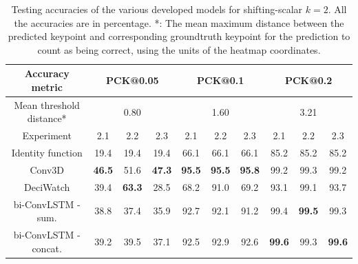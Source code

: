 \documentclass[./main.tex]{subfiles}
\begin{document}
\begin{table}[htbp]
    \begin{tabular}{c||ccc|ccc|ccc}
        \hline
        Accuracy metric & \multicolumn{3}{c}{PCK@0.05} & \multicolumn{3}{c}{PCK@0.1} & \multicolumn{3}{c}{PCK@0.2} \\
        \hline
        Mean threshold distance* & \multicolumn{3}{c}{0.80} & \multicolumn{3}{c}{1.60} & \multicolumn{3}{c}{3.21} \\
        \hline
        Experiment & 2.1 & 2.2 & 2.3 & 2.1 & 2.2 & 2.3 & 2.1 & 2.2 & 2.3 \\
        \hline
        \hline
        Identity function & 19.4 & 19.4 & 19.4 & 66.1 & 66.1 & 66.1 & 85.2 & 85.2 & 85.2 \\
        Conv3D & \textbf{46.5} & 51.6 & \textbf{47.3} & \textbf{95.5} & \textbf{95.5} & \textbf{95.8} & 99.2 & 99.3 & 99.2 \\
        DeciWatch & 39.4 & \textbf{63.3} & 28.5 & 68.2 & 91.0 & 69.2 & 93.1 & 99.1 & 93.7 \\
        bi-ConvLSTM - sum. & 38.8 & 37.4 & 35.9 & 92.7 & 92.1 & 91.2 & 99.4 & \textbf{99.5} & 99.3 \\
        bi-ConvLSTM - concat. & 39.2 & 39.5 & 37.1 & 92.5 & 92.9 & 92.6 & \textbf{99.6} & 99.3 & \textbf{99.6} \\
        \hline
    \end{tabular}
    \caption{Testing accuracies of the various developed models for shifting-scalar $k = 2$. All the accuracies are in percentage. *: The mean maximum distance between the predicted keypoint and corresponding groundtruth keypoint for the prediction to count as being correct, using the units of the heatmap coordinates.}
    \label{tab:finetune_test_accs_2}
\end{table}
\end{document}
